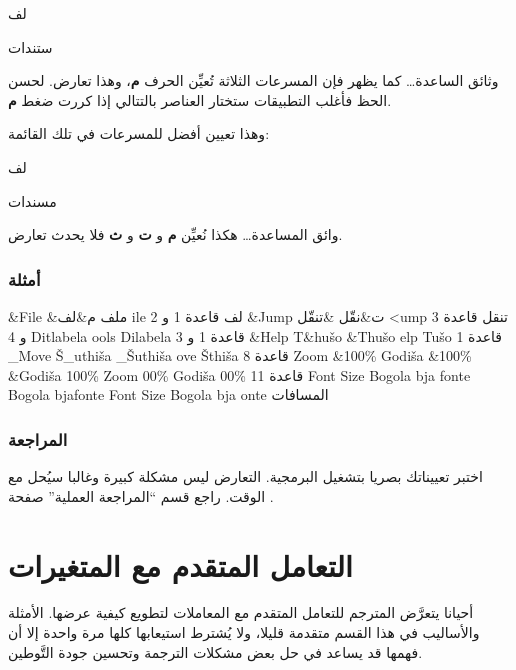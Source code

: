 \startitemize[1]
\item {}لف
\item {}ستندات
\item وثائق الساعدة…
\stopitemize
كما يظهر فإن المسرعات الثلاثة تُعيِّن الحرف {\bf م}، وهذا تعارض. لحسن
الحظ فأغلب التطبيقات ستختار العناصر بالتتالي إذا كررت ضغط {\bf م}.

وهذا تعيين أفضل للمسرعات في تلك القائمة:

\startitemize[1]
\item {}لف
\item مسندات
\item وائق المساعدة…
\stopitemize
هكذا نُعيِّن {\bf م} و {\bf ت} و {\bf ث} فلا يحدث تعارض.

\subsubsection{أمثلة}
\starttable[|l|l|l|l|l|l|]
\HL
\NC {} \NC {}
\NC {} \NC {} \NC
{} \NC {}\NC\AR
\HL
\NC \&File \NC \&ملف \NC م\&لف \NC {}ile \NC {}لف
\NC قاعدة 1 و 2\NC\AR
\HL
\NC \&Jump \NC ت\&نقّل \NC \&تنقّل \NC {}<ump \NC تنقل \NC
قاعدة 3 و 4\NC\AR
\HL
\NC {}  \NC {} \NC {} Ditlabela \NC
{}ools \NC Dilabela \NC قاعدة 1 و 3\NC\AR
\HL
\NC \&Help \NC T\&hušo \NC \&Thušo \NC {}elp \NC
Tušo \NC قاعدة 1\NC\AR
\HL
\NC \_Move \NC Š\_uthiša \NC \_Šuthiša \NC {}ove \NC
Šthiša \NC قاعدة 8\NC\AR
\HL
\NC Zoom \&100\% \NC Godiša \&100\% \NC \&Godiša 100\% \NC Zoom
00\% \NC Godiša 00\% \NC قاعدة 11\NC\AR
\HL
\NC {} Font Size \NC Bogola bja  fonte \NC Bogola
bja fonte \NC Font Size \NC Bogola bja onte \NC
المسافات\NC\AR
\HL
\stoptable
\subsubsection{المراجعة}
اختبر تعييناتك بصريا بتشغيل البرمجية. التعارض ليس مشكلة كبيرة وغالبا
سيُحل مع الوقت. راجع قسم “المراجعة العملية” صفحة
.

\section{التعامل المتقدم مع المتغيرات}
أحيانا يتعرَّض المترجم للتعامل
المتقدم مع المعاملات لتطويع كيفية عرضها. الأمثلة والأساليب في هذا القسم
متقدمة قليلا، ولا يُشترط استيعابها كلها مرة واحدة إلا أن فهمها قد يساعد
في حل بعض مشكلات الترجمة وتحسين جودة التَّوطين.

